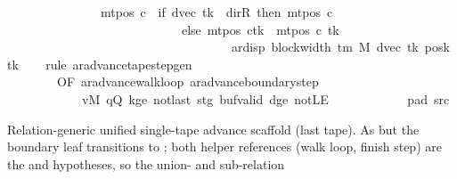 \begin{isabellebody}
\ \ \ \ \ \ \ \ \ \ \ \ \ \ {\isasymand}\ mt{\isacharunderscore}{\kern0pt}pos\ c{\isacharprime}{\kern0pt}\ {\isacharequal}{\kern0pt}\ {\isacharparenleft}{\kern0pt}if\ dvec\ tk\ {\isacharequal}{\kern0pt}\ dir{\isachardot}{\kern0pt}R\ then\ mt{\isacharunderscore}{\kern0pt}pos\ c{}\isanewline
\ \ \ \ \ \ \ \ \ \ \ \ \ \ \ \ \ \ \ \ \ \ \ \ \ \ \ \ else\ {\isacharparenleft}{\kern0pt}mt{\isacharunderscore}{\kern0pt}pos\ c{}{\isacharparenright}{\kern0pt}{\isacharparenleft}{\kern0pt}tk\ {\isacharcolon}{\kern0pt}{\isacharequal}{\kern0pt}\ mt{\isacharunderscore}{\kern0pt}pos\ c{}\ tk\isanewline
\ \ \ \ \ \ \ \ \ \ \ \ \ \ \ \ \ \ \ \ \ \ \ \ \ \ \ \ \ \ \ \ \ \ \ {\isacharminus}{\kern0pt}\ ar{\isacharunderscore}{\kern0pt}disp\ {\isacharparenleft}{\kern0pt}block{\isacharunderscore}{\kern0pt}width\ {\isacharparenleft}{\kern0pt}{\isasymGamma}{\isacharunderscore}{\kern0pt}tm\ M{\isacharparenright}{\kern0pt}{\isacharparenright}{\kern0pt}\ {\isacharparenleft}{\kern0pt}dvec\ tk{\isacharparenright}{\kern0pt}\ {\isacharparenleft}{\kern0pt}posk\ tk{\isacharparenright}{\kern0pt}{\isacharparenright}{\kern0pt}{\isacharparenright}{\kern0pt}{\isachardoublequoteclose}\isanewline
%
\isadelimproof
\ \ %
\endisadelimproof
%
\isatagproof
{}\isamarkupfalse%
\ {\isacharparenleft}{\kern0pt}rule\ ar{\isacharunderscore}{\kern0pt}advance{\isacharunderscore}{\kern0pt}tape{\isacharunderscore}{\kern0pt}step{\isacharunderscore}{\kern0pt}gen\isanewline
\ \ \ \ \ \ \ \ {\isacharbrackleft}{\kern0pt}OF\ ar{\isacharunderscore}{\kern0pt}advance{\isacharunderscore}{\kern0pt}walk{\isacharunderscore}{\kern0pt}loop\ ar{\isacharunderscore}{\kern0pt}advance{\isacharunderscore}{\kern0pt}boundary{\isacharunderscore}{\kern0pt}step\isanewline
\ \ \ \ \ \ \ \ \ \ \ \ vM\ qQ\ kge{}\ notlast\ stg\ buf{\isacharunderscore}{\kern0pt}valid\ dge{}\ notLE\isanewline
\ \ \ \ \ \ \ \ \ \ \ \ pad{}\ src{}{\isacharbrackright}{\kern0pt}{\isacharparenright}{\kern0pt}%
\endisatagproof
{\isafoldproof}%
%
\isadelimproof
%
\endisadelimproof
%
\begin{isamarkuptext}%
Relation-generic unified single-tape advance scaffold
  (last tape).  As  but the boundary
  leaf transitions to ; both helper references
  (walk loop, finish step) are the  and
   hypotheses, so the union- and sub-relation

\end{isamarkuptext}
\end{isabellebody}
